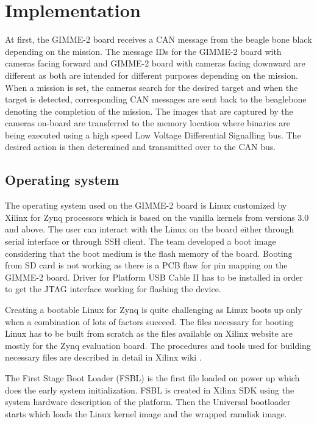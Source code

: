 \section{Implementation}\label{sec:implementation}
At first, the GIMME-2 board receives a CAN message from the beagle bone black depending on the mission. The message IDs for the GIMME-2 board with cameras facing forward and GIMME-2 board with cameras facing downward are different as both are intended for different purposes depending on the mission. When a mission is set, the cameras search for the desired target and when the target is detected, corresponding CAN messages are sent back to the beaglebone denoting the completion of the mission. The images that are captured by the cameras on-board are transferred to the memory location where binaries are being executed using a high speed Low Voltage Differential Signalling bus. The desired action is then determined and transmitted over to the CAN bus.

\subsection{Operating system}
The operating system used on the GIMME-2 board is Linux customized by Xilinx for Zynq processors which is based on the vanilla kernels from versions 3.0 and above. The user can interact with the Linux on the board either through serial interface or through SSH client. The team developed a boot image considering that the boot medium is the flash memory of the board. Booting from SD card is not working as there is a PCB flaw for pin mapping on the GIMME-2 board. Driver for Platform USB Cable II has to be installed in order to get the JTAG interface working for flashing the device.

Creating a bootable Linux for Zynq is quite challenging as Linux boots up only when a combination of lots of factors succeed. The files necessary for booting Linux has to be built from scratch as the files available on Xilinx website are mostly for the Zynq evaluation board. The procedures and tools used for building necessary files are described in detail in Xilinx wiki \cite{XilinxWiki}. 

The First Stage Boot Loader (FSBL) is the first file loaded on power up which does the early system initialization. FSBL is created in Xilinx SDK using the system hardware description of the platform. Then the Universal bootloader starts which loads the Linux kernel image and the wrapped ramdisk image.


